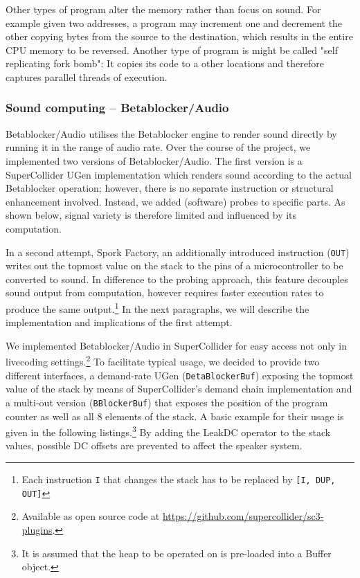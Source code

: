 \documentclass[letterpaper, 12pt]{article}
\begin{document}
Other types of program alter the memory rather than focus on sound. 
For example given two addresses, a program may increment one and decrement the other copying bytes from the source to the destination, which results in the entire CPU memory to be reversed. 
Another type of program is might be called "self replicating fork bomb": It copies its code to a other locations and therefore captures parallel threads of execution.

\subsubsection{Sound computing -- Betablocker/Audio} 
\label{sub:sound_computing}


Betablocker/Audio utilises the Betablocker engine to render sound directly by running it in the range of audio rate.
Over the course of the project, we implemented two versions of Betablocker/Audio.
The first version is a SuperCollider UGen implementation which renders sound according to the actual Betablocker operation; however, there is no separate instruction or structural enhancement involved.
Instead, we added (software) probes to specific parts.
As shown below, signal variety is therefore limited and influenced by its computation.


In a second attempt, Spork Factory, an additionally introduced instruction (\texttt{OUT}) writes out the topmost value on the stack to the pins of a microcontroller to be converted to sound.
In difference to the probing approach, this feature decouples sound output from computation, however requires faster execution rates to produce the same output.\footnote{Each instruction \texttt{I} that changes the stack has to be replaced by \texttt{[I, DUP, OUT]}}
In the next paragraphs, we will describe the implementation and implications of the first attempt.

We implemented Betablocker/Audio in SuperCollider for easy access not only in livecoding settings.\footnote{Available as open source code at \url{https://github.com/supercollider/sc3-plugins}.}
To facilitate typical usage, we decided to provide two different interfaces, a demand-rate UGen (\texttt{DetaBlockerBuf}) exposing the topmost value of the stack by means of SuperCollider's demand chain implementation and a multi-out version (\texttt{BBlockerBuf}) that exposes the position of the program counter as well as all 8 elements of the stack.
A basic example for their usage is given in the following listings.\footnote{It is assumed that the heap to be operated on is pre-loaded into a Buffer object.}
By adding the LeakDC operator to the stack values, possible DC offsets are prevented to affect the speaker system.
\end{document}

